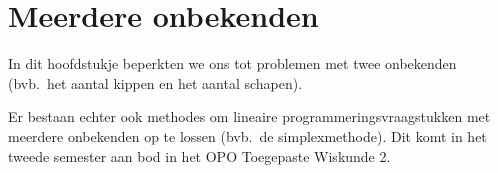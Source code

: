 \newpage
\section{Meerdere onbekenden}
In dit hoofdstukje beperkten we ons tot problemen met twee onbekenden
(bvb.\ het aantal kippen en het aantal schapen).

Er bestaan echter ook methodes om lineaire programmeringsvraagstukken
met meerdere onbekenden op te lossen (bvb.\ de simplexmethode).
Dit komt in het tweede semester aan bod in het OPO Toegepaste Wiskunde 2.

%
